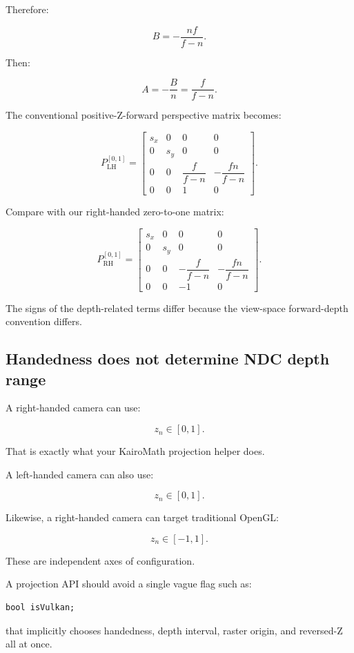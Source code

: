 Therefore:

\[
 \boxed{ B=-\frac{nf}{f-n} }.
\]

Then:

\[
 A=-\frac Bn=\frac f{f-n}.
\]

The conventional positive-Z-forward perspective matrix becomes:

\[
 \boxed{ P_{\mathrm{LH}}^{[0,1]}= \begin{bmatrix} s_x&0&0&0\\ 0&s_y&0&0\\ 0&0&\dfrac f{f-n}&-\dfrac{fn}{f-n}\\ 0&0&1&0 \end{bmatrix} }.
\]

Compare with our right-handed zero-to-one matrix:

\[
 P_{\mathrm{RH}}^{[0,1]}= \begin{bmatrix} s_x&0&0&0\\ 0&s_y&0&0\\ 0&0&-\dfrac f{f-n}&-\dfrac{fn}{f-n}\\ 0&0&-1&0 \end{bmatrix}.
\]

The signs of the depth-related terms differ because the view-space forward-depth convention differs.

\subsection{Handedness does not determine NDC depth range}\label{02-foundations-ii-ch033-handedness-does-not-determine-ndc-depth-range}

A right-handed camera can use:

\[
 z_n\in[0,1].
\]

That is exactly what your KairoMath projection helper does.

A left-handed camera can also use:

\[
 z_n\in[0,1].
\]

Likewise, a right-handed camera can target traditional OpenGL:

\[
 z_n\in[-1,1].
\]

These are independent axes of configuration.

A projection API should avoid a single vague flag such as:

\begin{verbatim}
bool isVulkan;
\end{verbatim}

that implicitly chooses handedness, depth interval, raster origin, and reversed-Z all at once.


